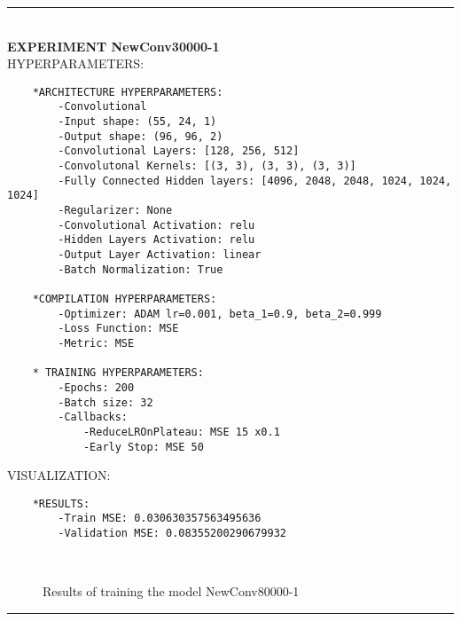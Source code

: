 \rule{0.5\textwidth}{0.5pt}\\

	{\large \textbf{EXPERIMENT NewConv30000-1}}\\
	
	{\normalsize HYPERPARAMETERS:}
	\begin{lstlisting}	
	*ARCHITECTURE HYPERPARAMETERS:
		-Convolutional
		-Input shape: (55, 24, 1)
		-Output shape: (96, 96, 2)
		-Convolutional Layers: [128, 256, 512]
		-Convolutonal Kernels: [(3, 3), (3, 3), (3, 3)]
		-Fully Connected Hidden layers: [4096, 2048, 2048, 1024, 1024, 1024]
		-Regularizer: None
		-Convolutional Activation: relu
		-Hidden Layers Activation: relu
		-Output Layer Activation: linear
		-Batch Normalization: True
	
	*COMPILATION HYPERPARAMETERS:
		-Optimizer: ADAM lr=0.001, beta_1=0.9, beta_2=0.999
		-Loss Function: MSE
		-Metric: MSE
	
	* TRAINING HYPERPARAMETERS:
		-Epochs: 200
		-Batch size: 32
		-Callbacks:
			-ReduceLROnPlateau: MSE 15 x0.1
			-Early Stop: MSE 50
	\end{lstlisting}
	
	{\normalsize VISUALIZATION:}
	\begin{lstlisting}
	*RESULTS:
        -Train MSE: 0.030630357563495636
        -Validation MSE: 0.08355200290679932
	\end{lstlisting}
	
	\begin{figure*}[ht!]
		\hspace{\fill}
		\hspace{\fill}	
		\\
		\caption{Results of training the model NewConv80000-1}
	\end{figure*}
	
\FloatBarrier	
\rule{0.5\textwidth}{0.5pt}\\